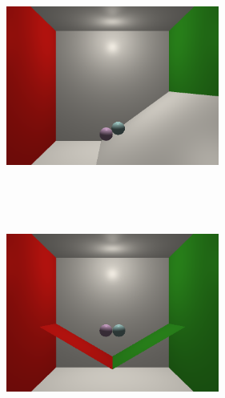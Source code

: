 \documentclass[acmtog]{acmart}
\begin{document}
\begin{figure}[h]
	\centering
	\includegraphics[width=7cm,height=7cm]{output3.png}
\end{figure}
\begin{figure}[h]
	\centering
	\includegraphics[width=7cm,height=7cm]{output4.png}
\end{figure}
\end{document}
